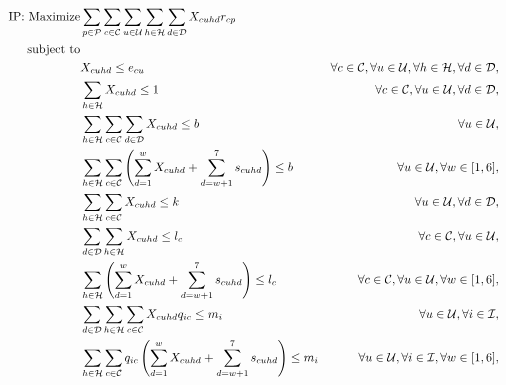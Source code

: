 \documentclass[11pt]{article}
\begin{document}
\begin{align}
\text{IP: }\text{Maximize} & \displaystyle
\sum\limits_{p\in \mathcal{P}}
\sum\limits_{c\in \mathcal{C}}
\sum\limits_{u\in \mathcal{U}}
\sum\limits_{h\in \mathcal{H}}
\sum\limits_{d\in \mathcal{D}}
X_{{c}{u}{h}{d}}  r_{{c}{p}} \label{mathmodel_obj}&
\\
\text{subject to} \notag\\
&X_{{c}{u}{h}{d}} \leq e_{{c}{u}}&\forall c \in \mathcal{C}, \forall u \in \mathcal{U}, \forall h \in \mathcal{H}, \forall d \in \mathcal{D}, \label{mathmodel_eligibility}&\\
&\sum\limits_{h\in\mathcal{H}}X_{{c}{u}{h}{d}} \leq 1 &\forall c \in \mathcal{C}, \forall u \in \mathcal{U}, \forall d \in \mathcal{D}, \label{mathmodel_singlechannel}&\\
&\sum\limits_{h\in\mathcal{H}}\sum\limits_{c\in\mathcal{C}}\sum\limits_{d\in\mathcal{D}}X_{{c}{u}{h}{d}} \leq b &\forall u \in \mathcal{U}, \label{mathmodel_percustomercommlimit}&\\
&\sum\limits_{h\in\mathcal{H}}\sum\limits_{c\in\mathcal{C}}\left(\sum_{d=1}^{w}X_{{c}{u}{h}{d}} + \sum_{d=w+1}^{7}s_{{c}{u}{h}{d}}\right) \leq b &\forall u \in \mathcal{U}, \forall w \in [1,6], \label{mathmodel_percustomercommlimit_rh}&\\
&\sum\limits_{h\in\mathcal{H}}\sum\limits_{c\in\mathcal{C}}X_{{c}{u}{h}{d}} \leq k &\forall u \in \mathcal{U}, \forall d \in \mathcal{D}, \label{mathmodel_percustomercommlimit_day}&\\
&\sum\limits_{d\in\mathcal{D}}\sum\limits_{h\in\mathcal{H}}X_{{c}{u}{h}{d}} \leq l_{c} &\forall c \in \mathcal{C}, \forall u \in \mathcal{U}, \label{mathmodel_percustomercamplimit}&\\
&\sum\limits_{h\in\mathcal{H}}\left( \sum_{d=1}^{w}X_{{c}{u}{h}{d}} + \sum_{d=w+1}^{7}s_{{c}{u}{h}{d}}\right) \leq l_{c} &\forall c \in \mathcal{C}, \forall u \in \mathcal{U}, \forall w \in [1,6], \label{mathmodel_percustomercamplimit_rh}&\\
&\sum\limits_{d\in\mathcal{D}}\sum\limits_{h\in\mathcal{H}}\sum\limits_{c\in\mathcal{C}}X_{{c}{u}{h}{d}}  q_{{i}{c}} \leq m_{i} &\forall u \in \mathcal{U}, \forall i \in \mathcal{I}, \label{mathmodel_weeklyquotalimit}&\\
&\sum\limits_{h\in\mathcal{H}}\sum\limits_{c\in\mathcal{C}}q_{{i}{c}}\left(\sum_{d=1}^{w}X_{{c}{u}{h}{d}} + \sum_{d=w+1}^{7}s_{{c}{u}{h}{d}}\right) \leq m_{i} &\forall u \in \mathcal{U}, \forall i \in \mathcal{I}, \forall w \in [1,6], \label{mathmodel_weeklyquotalimit_rh}&\\

\end{align}
\end{document}
